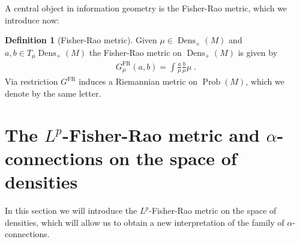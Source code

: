 \documentclass[11pt]{amsart}
\theoremstyle{definition}
\newtheorem{definition}[theorem]{Definition}
\newcommand{\Prob}{\operatorname{Prob}(M)}
\newcommand{\Dens}{\operatorname{Dens}_+(M)}
\newcommand{\Diff}{\operatorname{Diff}(M)}
\newcommand{\GFR}{G^{\mathrm{FR}}}
\begin{document}
A central object in information geometry is the Fisher-Rao metric, which we introduce now:
\begin{definition}[Fisher-Rao metric]
Given $\mu\in \Dens$ and $a,b\in T_\mu\Dens$ the Fisher-Rao metric on $\Dens$ is given by
\begin{align}\label{fisher-rao}
\GFR_{\mu}(a,b)=\int \frac{a}{\mu} \frac{b}{\mu}\mu\;.
\end{align}
Via restriction $\GFR$ induces a Riemannian metric on $\Prob$, which we denote by the same letter.
\end{definition}







\section{The $L^p$-Fisher-Rao metric and $\alpha$-connections on the space of densities}\label{sec:dens}
In this section we will introduce the $L^p$-Fisher-Rao metric on the space of densities, which will allow us to obtain a new interpretation of the family of $\alpha$-connections.

\end{document}
